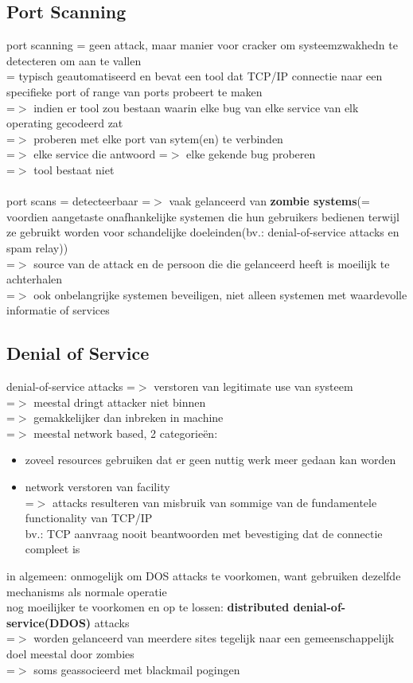 \documentclass{report}
\begin{document}
\subsection{Port Scanning}
port scanning = geen attack, maar manier voor cracker om systeemzwakhedn te detecteren om aan te vallen
\\= typisch geautomatiseerd en bevat een tool dat TCP/IP connectie naar een specifieke port of range van ports probeert te maken 
\\=$>$ indien er tool zou bestaan waarin elke bug van elke service van elk operating gecodeerd zat
\\=$>$ proberen met elke port van sytem(en) te verbinden
\\=$>$ elke service die antwoord =$>$ elke gekende bug proberen
\\=$>$ tool bestaat niet
\\
\\port scans = detecteerbaar =$>$ vaak gelanceerd van \textbf{zombie systems}(= voordien aangetaste onafhankelijke systemen die hun gebruikers bedienen terwijl ze gebruikt worden voor schandelijke doeleinden(bv.: denial-of-service attacks en spam relay))
\\=$>$ source van de attack en de persoon die die gelanceerd heeft is moeilijk te achterhalen
\\=$>$ ook onbelangrijke systemen beveiligen, niet alleen systemen met waardevolle informatie of services

\subsection{Denial of Service}
denial-of-service attacks =$>$ verstoren van legitimate use van systeem
\\=$>$ meestal dringt attacker niet binnen
\\=$>$ gemakkelijker dan inbreken in machine
\\=$>$ meestal network based, 2 categorie\"en:
\begin{itemize}
\item zoveel resources gebruiken dat er geen nuttig werk meer gedaan kan worden
\item network verstoren van facility
\\=$>$ attacks resulteren van misbruik van sommige van de fundamentele functionality van TCP/IP
\\bv.: TCP aanvraag nooit beantwoorden met bevestiging dat de connectie compleet is
\end{itemize}
in algemeen: onmogelijk om DOS attacks te voorkomen, want gebruiken dezelfde mechanisms als normale operatie
\\nog moeilijker te voorkomen en op te lossen: \textbf{distributed denial-of-service(DDOS)} attacks
\\=$>$ worden gelanceerd van meerdere sites tegelijk naar een gemeenschappelijk doel meestal door zombies
\\=$>$ soms geassocieerd met blackmail pogingen
\end{document}
